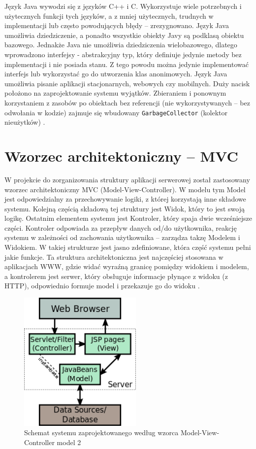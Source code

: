 \documentclass[eng,printmode,oneside]{mgr}
\begin{document}
Język Java wywodzi się z języków C++ i C. Wykorzystuje wiele potrzebnych i
użytecznych funkcji tych języków, a z mniej użytecznych, trudnych w
implementacji lub często powodujących błędy -- zrezygnowano. Język Java
umożliwia dziedziczenie, a ponadto wszystkie obiekty Javy są podklasą obiektu
bazowego. Jednakże Java nie umożliwia dziedziczenia wielobazowego, dlatego wprowadzono interfejsy -
abstrakcyjny typ, który definiuje jedynie metody bez implementacji i nie
posiada stanu. Z tego powodu można jedynie implementować
interfejs lub wykorzystać go do utworzenia klas anonimowych. Język Java
umożliwia pisanie aplikacji stacjonarnych, webowych czy mobilnych. Duży nacisk
położono na zaprojektowanie systemu wyjątków. Zbieraniem i ponownym
korzystaniem z zasobów po obiektach bez referencji (nie wykorzystywanych -- bez
odwołania w kodzie) zajmuje się wbudowany \texttt{GarbageCollector} (kolektor
nieużytków) \cite{java.doc}.

\section{Wzorzec architektoniczny -- MVC}

W projekcie do zorganizowania struktury aplikacji serwerowej został zastosowany
wzorzec architektoniczny MVC (Model-View-Controller). W modelu tym Model jest
odpowiedzialny za przechowywanie logiki, z której korzystają inne składowe
systemu. Kolejną częścią składową tej struktury jest Widok, który to jest
 swoją
logikę. Ostatnim elementem systemu jest Kontroler, który spaja dwie wcześniejsze
części. Kontroler odpowiada za przepływ danych od/do użytkownika, reakcję
systemu w zależności od zachowania użytkownika -- zarządza
takzę Modelem i Widokiem. W takiej strukturze jest jasno zdefiniowane, która
część systemu pełni jakie funkcje. Ta struktura architektoniczna 
jest najczęściej stosowana w aplikacjach WWW, gdzie widać
wyraźną granicę pomiędzy widokiem i modelem, a kontrolerem jest serwer, który
obsługuje informacje płynące z widoku (z HTTP), odpowiednio formuje model i
przekazuje go do widoku \cite{java.mvc,java.mvc.grafika}.

\begin{figure}[ht!]
\centering
\includegraphics[width=60mm]{jspModel.png}
\caption{Schemat systemu zaprojektowanego według wzorca
Model-View-Controller model 2 \cite{java.mvc.grafika}}
\label{fig:MVC2}
\end{figure}
\end{document}
